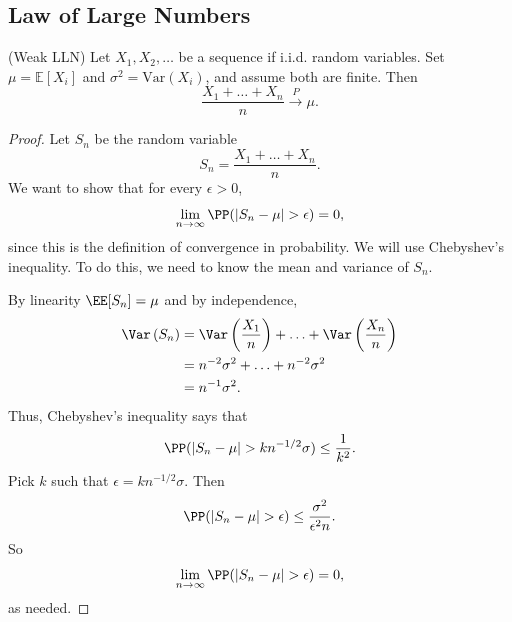 \documentclass{ximera}
\begin{document}
\subsection{Law of Large Numbers}
\begin{theorem} (Weak LLN)
Let $X_1,X_2,\ldots$ be a sequence if i.i.d. random variables. Set $\mu = \mathbb{E}[X_i]$ and $\sigma^2 = \mathrm{Var}(X_i)$, and assume both are finite. Then 
$$
\frac{X_1 + \ldots + X_n}{n} \stackrel{P}{\rightarrow} \mu.
$$
\end{theorem}
\begin{proof}
Let $S_n$ be the random variable
$$
S_n = \frac{X_1 + \ldots + X_n}{n}.
$$ 
We want to show that for every $\epsilon >0$,
$$
\lim_{n\rightarrow \infty} \PP( \vert S_n - \mu \vert > \epsilon)=0,
$$
since this is the definition of convergence in probability. We will use Chebyshev's inequality. To do this, we need to know the mean and variance of $S_n$.

By linearity $\EE[S_n]=\mu$ and by independence, 
\begin{align*}
\Var\left( S_n \right) &= \Var\left( \frac{X_1}{n} \right)  + \ldots + \Var\left( \frac{X_n}{n} \right) \\
&= n^{-2}\sigma^2 + \ldots + n^{-2}\sigma^2 \\
&= n^{-1} \sigma^2.
\end{align*}
Thus, Chebyshev's inequality says that
$$
\PP( | S_n - \mu| > kn^{-1/2}\sigma) \leq \frac{1}{k^2}.
$$
Pick $k$ such that $\epsilon = kn^{-1/2}\sigma$. Then
$$
\PP( \vert S_n - \mu \vert > \epsilon) \leq \frac{\sigma^2}{\epsilon^2 n}.
$$
So 
$$
\lim_{n\rightarrow \infty} \PP( \vert S_n - \mu \vert > \epsilon)=0,
$$
as needed.
\end{proof}
\end{document}
